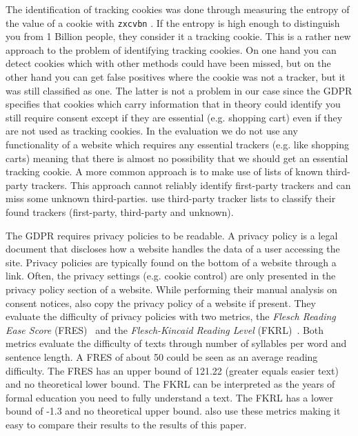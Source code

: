 The identification of tracking cookies was done through measuring the entropy of the value of a cookie with
\texttt{zxcvbn} \cite{wheeler2016zxcvbn}. If the entropy is high enough to distinguish you from 1 Billion people, they
consider it a tracking cookie. This is a rather new approach to the problem of identifying tracking cookies.
On one hand you can detect cookies which with other methods could have been missed, but on the other hand you can get false positives
where the cookie was not a tracker, but it was still classified as one. The latter is not a problem in our case since the
GDPR specifies that cookies which carry information that in theory could identify you still require consent except if
they are essential (e.g. shopping cart) even if they are not used as tracking cookies. In the evaluation we do not use any functionality of a
website which requires any essential trackers (e.g. like shopping carts) meaning that there is almost no possibility
that we should get an essential tracking cookie.
A more common approach is to make use of lists of known third-party trackers. This approach cannot reliably identify
first-party trackers and can miss some unknown third-parties. \citeauthor{sanchez2019can} use third-party tracker lists
to classify their found trackers (first-party, third-party and unknown).

The GDPR requires privacy policies to be readable. A privacy policy is a legal document that discloses how
a website handles the data of a user accessing the site. Privacy policies are typically found on the bottom
of a website through a link. Often, the privacy settings (e.g. cookie control) are only presented
in the privacy policy section of a website. While performing their manual analysis on consent notices,
\citeauthor{sanchez2019can} also copy the privacy policy of a website if present. They evaluate the difficulty of
privacy policies with
two metrics, the \emph{Flesch Reading Ease Score} (FRES)~\cite{flesch1948new} and the \emph{Flesch-Kincaid Reading
Level} (FKRL)~\cite{kincaid1975derivation}. Both metrics evaluate the difficulty of texts through number of syllables
per word and sentence length. A FRES of about 50 could be seen as an average reading difficulty. The FRES has an upper
bound of 121.22 (greater equals easier text) and no theoretical lower bound. The FKRL can be interpreted as the years of
formal education you need to fully understand a text. The FKRL has a lower bound of -1.3 and no
theoretical upper bound.  also use these metrics making it easy to compare their results to the
results of this paper.

